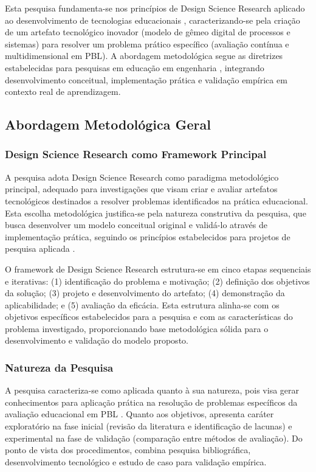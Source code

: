\documentclass[12pt,a4paper]{article}
\renewcommand{\cite}[1]{}
\begin{document}
Esta pesquisa fundamenta-se nos princípios de Design Science Research aplicado
ao desenvolvimento de tecnologias educacionais \cite{gil91}, caracterizando-se
pela criação de um artefato tecnológico inovador (modelo de gêmeo digital de
processos e sistemas) para resolver um problema prático específico (avaliação
contínua e multidimensional em PBL). A abordagem metodológica segue as
diretrizes estabelecidas para pesquisas em educação em engenharia
\cite{andrade99}, integrando desenvolvimento conceitual, implementação prática
e validação empírica em contexto real de aprendizagem.

\subsection{Abordagem Metodológica Geral}

\subsubsection{Design Science Research como Framework Principal}

A pesquisa adota Design Science Research como paradigma metodológico principal,
adequado para investigações que visam criar e avaliar artefatos tecnológicos
destinados a resolver problemas identificados na prática educacional. Esta
escolha metodológica justifica-se pela natureza construtiva da pesquisa, que
busca desenvolver um modelo conceitual original e validá-lo através de
implementação prática, seguindo os princípios estabelecidos para projetos de
pesquisa aplicada \cite{gil91}.

O framework de Design Science Research estrutura-se em cinco etapas sequenciais
e iterativas: (1) identificação do problema e motivação; (2) definição dos
objetivos da solução; (3) projeto e desenvolvimento do artefato; (4)
demonstração da aplicabilidade; e (5) avaliação da eficácia. Esta estrutura
alinha-se com os objetivos específicos estabelecidos para a pesquisa e com as
características do problema investigado, proporcionando base metodológica
sólida para o desenvolvimento e validação do modelo proposto.

\subsubsection{Natureza da Pesquisa}

A pesquisa caracteriza-se como aplicada quanto à sua natureza, pois visa gerar
conhecimentos para aplicação prática na resolução de problemas específicos da
avaliação educacional em PBL \cite{gil91}. Quanto aos objetivos, apresenta
caráter exploratório na fase inicial (revisão da literatura e identificação de
lacunas) e experimental na fase de validação (comparação entre métodos de
avaliação). Do ponto de vista dos procedimentos, combina pesquisa
bibliográfica, desenvolvimento tecnológico e estudo de caso para validação
empírica.
\end{document}

